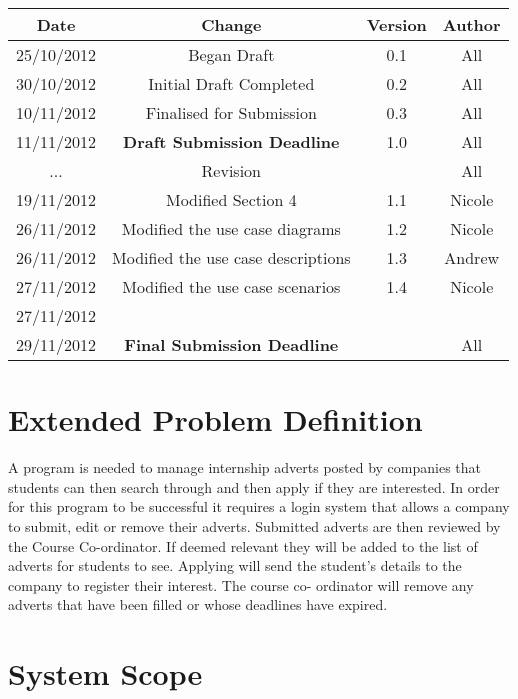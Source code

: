 \documentclass{l3deliverable}
\begin{document}
\begin{center}{
\begin{tabular}{|c|c|c|c|}
\hline \textbf{Date} &\textbf{ Change} & \textbf{Version} & \textbf{Author}\\ 
\hline 25/10/2012 & Began Draft & 0.1 & All \\ 
\hline 30/10/2012 & Initial Draft Completed & 0.2 & All \\ 
\hline 10/11/2012 & Finalised for Submission & 0.3 & All\\ 
\hline 11/11/2012 & \textbf{Draft Submission Deadline} & 1.0 & All\\ 
\hline ... & Revision & & All\\ 
\hline 19/11/2012 & Modified Section 4 & 1.1 & Nicole\\
\hline 26/11/2012 & Modified the use case diagrams & 1.2 & Nicole\\
\hline 26/11/2012 & Modified the use case descriptions & 1.3 & Andrew\\
\hline 27/11/2012 & Modified the use case scenarios & 1.4 & Nicole\\
\hline 27/11/2012 & & &\\
\hline 29/11/2012 & \textbf{Final Submission Deadline} & & All\\ 
\hline 
\end{tabular} }
\end{center}

\section{Extended Problem Definition}
A program is needed to manage internship adverts posted by companies that students can then
search through and then apply if they are interested.
In order for this program to be successful it requires a login system that allows a company
to submit, edit or remove their adverts. Submitted adverts are then reviewed by the Course
Co-ordinator. If deemed relevant they will be added to the list of adverts for students to see.
Applying will send the student’s details to the company to register their interest. The course co-
ordinator will remove any adverts that have been filled or whose deadlines have expired.\\
\section{System Scope}
\end{document}
